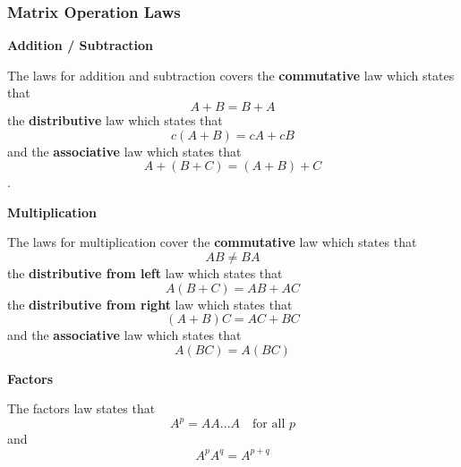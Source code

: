         \subsubsection{Matrix Operation Laws}
        
            \par \hfill \break
            \textbf{Addition / Subtraction}
            \par \hfill \break
            The laws for addition and subtraction covers the \textbf{commutative} law which states that 
            \begin{equation}
                A + B = B + A
            \end{equation}
            the \textbf{distributive} law which states that 
            \begin{equation}
                c(A + B) = cA + cB
            \end{equation}
            and the \textbf{associative} law which states that 
            \begin{equation}
                A+(B+C) = (A+B)+C
            \end{equation}.

            \par \hfill \break
            \textbf{Multiplication}
            \par \hfill \break
            The laws for multiplication cover the \textbf{commutative} law which states that 
            \begin{equation}
                AB \neq BA
            \end{equation}
            the \textbf{distributive from left} law which states that 
            \begin{equation}
                A(B+C)=AB+AC
            \end{equation}
            the \textbf{distributive from right} law which states that 
            \begin{equation}
                (A+B)C=AC+BC
            \end{equation}
            and the \textbf{associative} law which states that 
            \begin{equation}
                A(BC) = A(BC)
            \end{equation}

            \par \hfill \break
            \textbf{Factors}
            \par \hfill \break
            The factors law states that 
            \begin{equation}
                A^p = AA ... A \quad  \textrm{for all \(p\)}
            \end{equation}
            and 
            \begin{equation}
                A^p A^q = A^{p+q}
            \end{equation}

